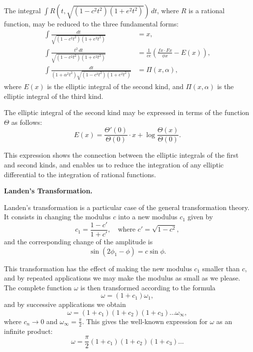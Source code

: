 \documentclass[12pt,a4paper]{article}
\begin{document}
\newpage
\setcounter{page}{149}

The integral $\int R(t, \sqrt{(1 - c^2 t^2)(1 + e^2 t^2)})\, dt$, where $R$ is a rational function,
may be reduced to the three fundamental forms:
\begin{align*}
\int \frac{dt}{\sqrt{(1 - c^2 t^2)(1 + e^2 t^2)}} &= x,\\
\int \frac{t^2\,dt}{\sqrt{(1 - c^2 t^2)(1 + e^2 t^2)}} &= \frac{1}{ce}\left(\frac{f x \cdot F x}{\phi x} - E(x)\right),\\
\int \frac{dt}{(1 + \alpha^2 t^2)\sqrt{(1 - c^2 t^2)(1 + e^2 t^2)}} &= \Pi(x, \alpha),
\end{align*}
where $E(x)$ is the elliptic integral of the second kind, and $\Pi(x, \alpha)$ is the elliptic
integral of the third kind.

\newpage
\setcounter{page}{150}

The elliptic integral of the second kind may be expressed in terms of the function
$\Theta$ as follows:
\[
E(x) = \frac{\Theta'(0)}{\Theta(0)} \cdot x + \log \frac{\Theta(x)}{\Theta(0)}.
\]

This expression shows the connection between the elliptic integrals of the first and
second kinds, and enables us to reduce the integration of any elliptic differential to
the integration of rational functions.

\medskip

\textbf{Landen's Transformation.}

Landen's transformation is a particular case of the general transformation theory.
It consists in changing the modulus $c$ into a new modulus $c_1$ given by
\[
c_1 = \frac{1 - c'}{1 + c'},\quad \text{where } c' = \sqrt{1 - c^2},
\]
and the corresponding change of the amplitude is
\[
\sin(2\phi_1 - \phi) = c \sin \phi.
\]

\newpage
\setcounter{page}{151}

This transformation has the effect of making the new modulus $c_1$ smaller than $c$,
and by repeated applications we may make the modulus as small as we please. The
complete function $\omega$ is then transformed according to the formula
\[
\omega = (1 + c_1)\omega_1,
\]
and by successive applications we obtain
\[
\omega = (1 + c_1)(1 + c_2)(1 + c_3)\ldots \omega_{\infty},
\]
where $c_n \to 0$ and $\omega_{\infty} = \frac{\pi}{2}$. This gives the well-known expression for $\omega$ as an infinite
product:
\[
\omega = \frac{\pi}{2} (1 + c_1)(1 + c_2)(1 + c_3) \ldots
\]

\newpage
\setcounter{page}{152}
\end{document}
